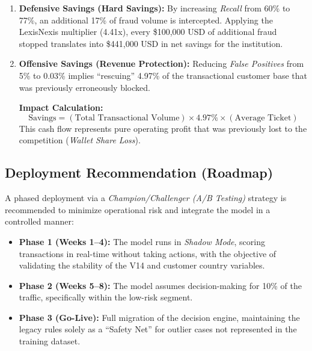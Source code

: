 \documentclass[12pt,a4paper]{report}
\begin{document}
\begin{enumerate}
    \item \textbf{Defensive Savings (Hard Savings):}  
    By increasing \textit{Recall} from 60\% to 77\%, an additional 17\% of fraud volume is intercepted. Applying the LexisNexis multiplier (4.41x), every \$100,000 USD of additional fraud stopped translates into \$441,000 USD in net savings for the institution.

    \item \textbf{Offensive Savings (Revenue Protection):}  
    Reducing \textit{False Positives} from 5\% to 0.03\% implies \textquotedblleft rescuing\textquotedblright{} 4.97\% of the transactional customer base that was previously erroneously blocked.

    \textbf{Impact Calculation:}  
    \[
    \text{Savings} = (\text{Total Transactional Volume}) \times 4.97\% \times (\text{Average Ticket})
    \]
    This cash flow represents pure operating profit that was previously lost to the competition (\textit{Wallet Share Loss}).
\end{enumerate}







\subsection{Deployment Recommendation (Roadmap)}

A phased deployment via a \textit{Champion/Challenger (A/B Testing)} strategy is recommended to minimize operational risk and integrate the model in a controlled manner:

\begin{itemize}
    \item \textbf{Phase 1 (Weeks 1--4):} The model runs in \textit{Shadow Mode}, scoring transactions in real-time without taking actions, with the objective of validating the stability of the V14 and customer country variables.
    
    \item \textbf{Phase 2 (Weeks 5--8):} The model assumes decision-making for 10\% of the traffic, specifically within the low-risk segment.
    
    \item \textbf{Phase 3 (Go-Live):} Full migration of the decision engine, maintaining the legacy rules solely as a \textquotedblleft Safety Net\textquotedblright{} for outlier cases not represented in the training dataset.
\end{itemize}
\end{document}

